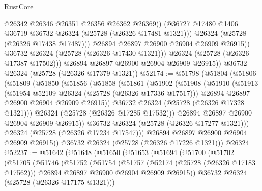 \begin{lexlean}{RustCore}
\begin{coremodule}
                      @26342
                      @26346
                      @26351
                      @26356
                      @26362
                      @26369))
                  (@36727 @17480 @1406 @36719 @36732 @26324 (@25728 (@26326 @17481 @1321)))
                  @26324
                  (@25728 (@26326 @17438 @17487)))
                @26894
                @26897
                @26900
                @26904
                @26909
                @26915))
            @36732
            @26324
            (@25728 (@26326 @17430 @1321)))
          @26324
          (@25728 (@26326 @17387 @17502)))
        @26894
        @26897
        @26900
        @26904
        @26909
        @26915))
    @36732
    @26324
    (@25728 (@26326 @17379 @1321))
@52174 := @51798
    (@51804
      (@51806
        (@51809
          (@51850
            (@51856
              (@51858
                (@51861
                  (@51902
                    (@51908
                      (@51910
                        (@51913
                          (@51954 @52109 @26324 (@25728 (@26326 @17336 @17517)))
                          @26894
                          @26897
                          @26900
                          @26904
                          @26909
                          @26915))
                      @36732
                      @26324
                      (@25728 (@26326 @17328 @1321)))
                    @26324
                    (@25728 (@26326 @17285 @17532)))
                  @26894
                  @26897
                  @26900
                  @26904
                  @26909
                  @26915))
              @36732
              @26324
              (@25728 (@26326 @17277 @1321)))
            @26324
            (@25728 (@26326 @17234 @17547)))
          @26894
          @26897
          @26900
          @26904
          @26909
          @26915))
      @36732
      @26324
      (@25728 (@26326 @17226 @1321)))
    @26324
@52237 := @51642
    (@51648
      (@51650
        (@51653
          (@51694
            (@51700
              (@51702
                (@51705
                  (@51746
                    (@51752
                      (@51754
                        (@51757
                          (@52174 (@25728 (@26326 @17183 @17562)))
                          @26894
                          @26897
                          @26900
                          @26904
                          @26909
                          @26915))
                      @36732
                      @26324
                      (@25728 (@26326 @17175 @1321)))

\end{coremodule}
\end{lexlean}
